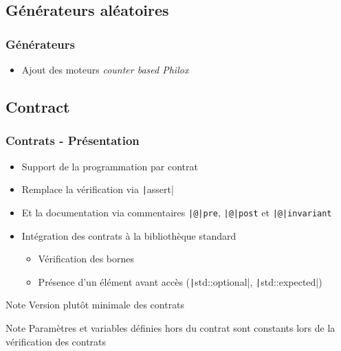 \documentclass[C++.tex]{subfiles}
\begin{document}
\subsection*{Générateurs aléatoires}
\begin{frame}[fragile]
	\frametitle{Générateurs}
	\begin{itemize}
		\item Ajout des moteurs \textit{counter based Philox}
	\end{itemize}

\end{frame}

\subsection*{Contract}
\begin{frame}[fragile]
	\frametitle{Contrats - Présentation}
	\begin{itemize}
		\item Support de la programmation par contrat
		\item Remplace la vérification via \texttt|assert|
		\item Et la documentation via commentaires \texttt{|@|pre}, \texttt{|@|post} et \texttt{|@|invariant}
		\item Intégration des contrats à la bibliothèque standard
		\begin{itemize}
			\item Vérification des bornes
			\item Présence d'un élément avant accès (\texttt|std::optional|, \texttt|std::expected|)
		\end{itemize}
	\end{itemize}

	\begin{block}{Note}
		Version plutôt minimale des contrats
	\end{block}

	\begin{block}{Note}
		Paramètres et variables définies hors du contrat sont constants lors de la vérification des contrats
	\end{block}

\end{frame}
\end{document}
